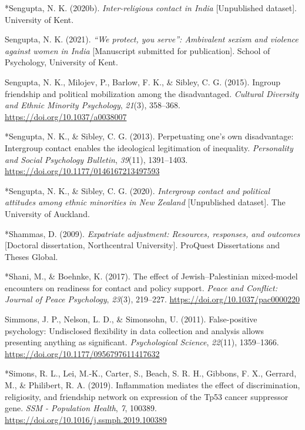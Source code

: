 \documentclass[12pt, letterpaper]{article}
\newenvironment{CSLReferences}[2]{}{}
\begin{document}
\begin{CSLReferences}{1}{0}
\leavevmode\hypertarget{ref-2385}{}%
*Sengupta, N. K. (2020b). \emph{Inter-religious contact in {India}}
{[}Unpublished dataset{]}. University of Kent.

\leavevmode\hypertarget{ref-sengupta_protect_unpublished}{}%
Sengupta, N. K. (2021). \emph{{``We protect, you serve''}: Ambivalent
sexism and violence against women in {India}} {[}Manuscript submitted
for publication{]}. School of Psychology, University of Kent.

\leavevmode\hypertarget{ref-sengupta_ingroup_2015}{}%
Sengupta, N. K., Milojev, P., Barlow, F. K., \& Sibley, C. G. (2015).
Ingroup friendship and political mobilization among the disadvantaged.
\emph{Cultural Diversity and Ethnic Minority Psychology}, \emph{21}(3),
358--368. \url{https://doi.org/10.1037/a0038007}

\leavevmode\hypertarget{ref-1695}{}%
*Sengupta, N. K., \& Sibley, C. G. (2013). Perpetuating one's own
disadvantage: Intergroup contact enables the ideological legitimation of
inequality. \emph{Personality and Social Psychology Bulletin},
\emph{39}(11), 1391--1403.
\url{https://doi.org/10.1177/0146167213497593}

\leavevmode\hypertarget{ref-2381}{}%
*Sengupta, N. K., \& Sibley, C. G. (2020). \emph{Intergroup contact and
political attitudes among ethnic minorities in {New Zealand}}
{[}Unpublished dataset{]}. The University of Auckland.

\leavevmode\hypertarget{ref-1891}{}%
*Shammas, D. (2009). \emph{Expatriate adjustment: {Resources},
responses, and outcomes} {[}Doctoral dissertation, Northcentral
University{]}. {ProQuest Dissertations and Theses Global}.

\leavevmode\hypertarget{ref-789}{}%
*Shani, M., \& Boehnke, K. (2017). The effect of {Jewish}--{Palestinian}
mixed-model encounters on readiness for contact and policy support.
\emph{Peace and Conflict: Journal of Peace Psychology}, \emph{23}(3),
219--227. \url{https://doi.org/10.1037/pac0000220}

\leavevmode\hypertarget{ref-simmons_false-positive_2011}{}%
Simmons, J. P., Nelson, L. D., \& Simonsohn, U. (2011). False-positive
psychology: Undisclosed flexibility in data collection and analysis
allows presenting anything as significant. \emph{Psychological Science},
\emph{22}(11), 1359--1366.
\url{https://doi.org/10.1177/0956797611417632}

\leavevmode\hypertarget{ref-3060}{}%
*Simons, R. L., Lei, M.-K., Carter, S., Beach, S. R. H., Gibbons, F. X.,
Gerrard, M., \& Philibert, R. A. (2019). Inflammation mediates the
effect of discrimination, religiosity, and friendship network on
expression of the {Tp53} cancer suppressor gene. \emph{SSM - Population
Health}, \emph{7}, 100389.
\url{https://doi.org/10.1016/j.ssmph.2019.100389}


\end{CSLReferences}
\end{document}
